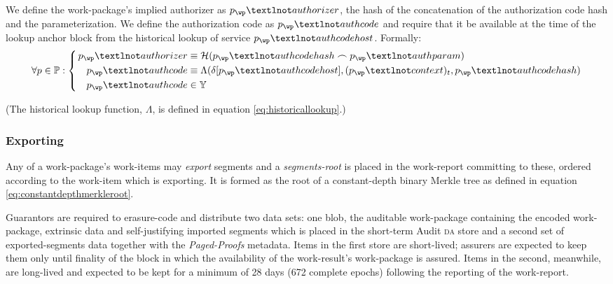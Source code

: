 We define the work-package's implied authorizer as $\wpX_\wp¬authorizer$, the hash of the concatenation of the authorization code hash and the parameterization. We define the authorization code as $\wpX_\wp¬authcode$ and require that it be available at the time of the lookup anchor block from the historical lookup of service $\wpX_\wp¬authcodehost$. Formally:
\begin{equation}
  \forall \wpX \in \mathbb{P}: \left\{\,\begin{aligned}
    \wpX_\wp¬authorizer &\equiv \mathcal{H}(\wpX_\wp¬authcodehash \concat \wpX_\wp¬authparam) \\
    \wpX_\wp¬authcode &\equiv \Lambda(\delta[\wpX_\wp¬authcodehost], (\wpX_\wp¬context)_t, \wpX_\wp¬authcodehash) \\
    \wpX_\wp¬authcode &\in \Y
  \end{aligned}\right.
\end{equation}

(The historical lookup function, $\Lambda$, is defined in equation \ref{eq:historicallookup}.)

\subsubsection{Exporting}
Any of a work-package's work-items may \emph{export} segments and a \emph{segments-root} is placed in the work-report committing to these, ordered according to the work-item which is exporting. It is formed as the root of a constant-depth binary Merkle tree as defined in equation \ref{eq:constantdepthmerkleroot}.

Guarantors are required to erasure-code and distribute two data sets: one blob, the auditable work-package containing the encoded work-package, extrinsic data and self-justifying imported segments which is placed in the short-term Audit \textsc{da} store and a second set of exported-segments data together with the \emph{Paged-Proofs} metadata. Items in the first store are short-lived; assurers are expected to keep them only until finality of the block in which the availability of the work-result's work-package is assured. Items in the second, meanwhile, are long-lived and expected to be kept for a minimum of 28 days (672 complete epochs) following the reporting of the work-report.

